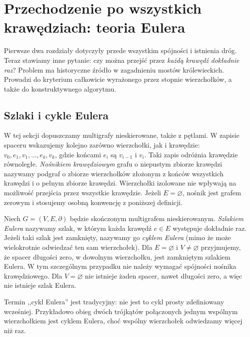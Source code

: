 \chapter{Przechodzenie po wszystkich krawędziach: teoria Eulera}
\label{ch:tg-euler}

Pierwsze dwa rozdziały dotyczyły przede wszystkim spójności i istnienia
dróg. Teraz stawiamy inne pytanie: czy można przejść przez \emph{każdą
krawędź dokładnie raz}? Problem ma historyczne źródło w zagadnieniu
mostów królewieckich. Prowadzi do kryterium całkowicie wyrażonego
przez stopnie wierzchołków, a także do konstruktywnego algorytmu.

\section{Szlaki i cykle Eulera}
\label{sec:tg-euler-def}

W tej sekcji dopuszczamy multigrafy nieskierowane, także z pętlami.
W zapisie spaceru wskazujemy kolejno zarówno wierzchołki, jak i
krawędzie: $v_0,e_1,v_1,\ldots,e_k,v_k$, gdzie końcami $e_i$ są
$v_{i-1}$ i $v_i$. Taki zapis odróżnia krawędzie równoległe.
\emph{Nośnikiem krawędziowym} grafu o niepustym zbiorze
krawędzi nazywamy podgraf o zbiorze wierzchołków złożonym
z końców wszystkich krawędzi i o pełnym zbiorze krawędzi.
Wierzchołki izolowane nie wpływają na możliwość przejścia
przez wszystkie krawędzie. Jeżeli $E=\varnothing$, nośnik
jest grafem zerowym i stosujemy osobną konwencję
z poniższej definicji.

\begin{definicja}
Niech $G=(V,E,\partial)$ będzie skończonym multigrafem nieskierowanym.
\emph{Szlakiem Eulera} nazywamy szlak, w którym każda krawędź
$e\in E$ występuje dokładnie raz. Jeżeli taki szlak jest zamknięty,
nazywamy go \emph{cyklem Eulera} (mimo że może wielokrotnie
odwiedzać ten sam wierzchołek). Dla $E=\varnothing$ i $V\ne\varnothing$ przyjmujemy,
że spacer długości zero, w dowolnym wierzchołku,
jest zamkniętym szlakiem Eulera. W tym szczególnym przypadku
nie należy wymagać spójności nośnika krawędziowego.
Dla $V=\varnothing$ nie istnieje żaden spacer,
nawet długości zero, a więc nie istnieje szlak Eulera.
\end{definicja}

Termin ,,cykl Eulera'' jest tradycyjny: nie jest to cykl prosty
zdefiniowany wcześniej. Przykładowo obieg dwóch trójkątów
połączonych jednym wspólnym wierzchołkiem jest cyklem Eulera,
choć wspólny wierzchołek odwiedzamy więcej niż raz.

